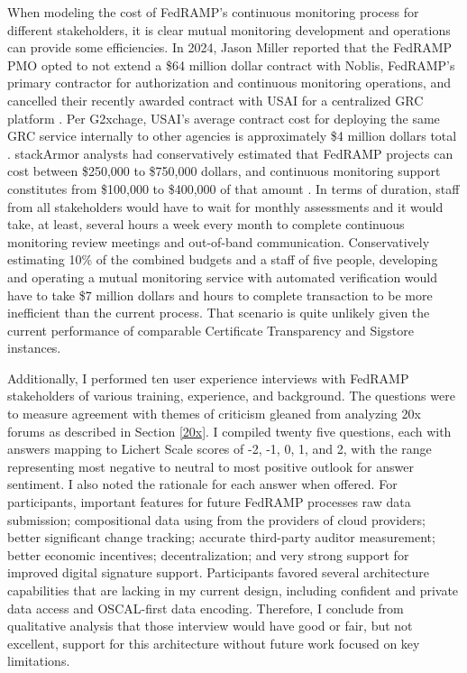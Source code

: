 \documentclass{jdf}
\begin{document}
When modeling the cost of FedRAMP's continuous monitoring process for different stakeholders, it is clear mutual monitoring development and operations can provide some efficiencies. In 2024, Jason Miller reported that the FedRAMP PMO opted to not extend a \$64 million dollar contract with Noblis, FedRAMP's primary contractor for authorization and continuous monitoring operations, and cancelled their recently awarded contract with USAI for a centralized GRC platform \citeyear{miller25}. Per G2xchage, USAI's average contract cost for deploying the same GRC service internally to other agencies is approximately \$4 million dollars total \citeyear{g2xchange_usai25}. stackArmor analysts had conservatively estimated that FedRAMP projects can cost between \$250,000 to \$750,000 dollars, and continuous monitoring support constitutes from \$100,000 to \$400,000 of that amount \citeyear{stackarmor24}. In terms of duration, staff from all stakeholders would have to wait for monthly assessments and it would take, at least, several hours a week every month to complete continuous monitoring review meetings and out-of-band communication. Conservatively estimating 10\% of the combined budgets and a staff of five people, developing and operating a mutual monitoring service with automated verification would have to take \$7 million dollars and hours to complete transaction to be more inefficient than the current process. That scenario is quite unlikely given the current performance of comparable Certificate Transparency and Sigstore instances.

Additionally, I performed ten user experience interviews with FedRAMP stakeholders of various training, experience, and background. The questions were to measure agreement with themes of criticism gleaned from analyzing 20x forums as described in Section \ref{20x}. I compiled twenty five questions, each with answers mapping to Lichert Scale scores of -2, -1, 0, 1, and 2, with the range representing most negative to neutral to most positive outlook for answer sentiment. I also noted the rationale for each answer when offered. For participants, important features for future FedRAMP processes raw data submission; compositional data using from the providers of cloud providers; better significant change tracking; accurate third-party auditor measurement; better economic incentives; decentralization; and very strong support for improved digital signature support. Participants favored several architecture capabilities that are lacking in my current design, including confident and private data access and OSCAL-first data encoding. Therefore, I conclude from qualitative analysis that those interview would have good or fair, but not excellent, support for this architecture without future work focused on key limitations.
\end{document}
